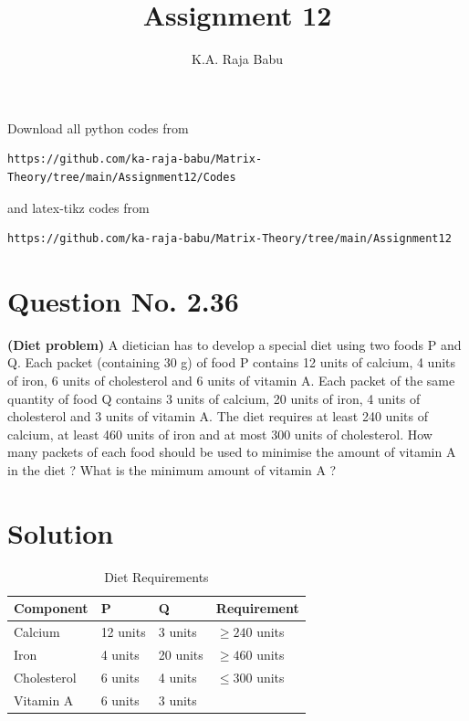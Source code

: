 \documentclass[journal,12pt,twocolumn]{IEEEtran}
\begin{document}
\makeatother
\let\StandardTheFigure\thefigure
\let\vec\mathbf
\renewcommand{\thefigure}{\theproblem}
\def\putbox#1#2#3{\makebox[0in][l]{\makebox[#1][l]{}\raisebox{\baselineskip}[0in][0in]{\raisebox{#2}[0in][0in]{#3}}}}
     \def\rightbox#1{\makebox[0in][r]{#1}}
     \def\centbox#1{\makebox[0in]{#1}}
     \def\topbox#1{\raisebox{-\baselineskip}[0in][0in]{#1}}
     \def\midbox#1{\raisebox{-0.5\baselineskip}[0in][0in]{#1}}
\vspace{3cm}
\title{Assignment 12}
\author{K.A. Raja Babu}
\maketitle
\newpage
\bigskip
\renewcommand{\thefigure}{\theenumi}
\renewcommand{\thetable}{\theenumi}
Download all python codes from 
\begin{lstlisting}
https://github.com/ka-raja-babu/Matrix-Theory/tree/main/Assignment12/Codes
\end{lstlisting}
%
and latex-tikz codes from 
%
\begin{lstlisting}
https://github.com/ka-raja-babu/Matrix-Theory/tree/main/Assignment12
\end{lstlisting}
%
\section{Question No. 2.36}

\textbf{(Diet problem)} A dietician has to develop a special diet using two foods P and Q. Each packet (containing 30 g) of food P contains 12 units of calcium, 4 units of iron, 6 units of cholesterol and 6 units of vitamin A. Each packet of the same quantity of food Q contains 3 units of calcium, 20 units of iron, 4 units of cholesterol and 3 units of vitamin A. The diet requires at least 240 units of calcium, at least 460 units of iron and at most 300 units of cholesterol. How many packets of each food should be used to minimise the amount of vitamin A in the diet ? What is the minimum amount of vitamin A ?

\section{Solution}

\begin{table}[!ht]
\begin{center}
\begin{tabular}{ | m{2.1cm} | m{1.4cm}| m{1.4cm} | m{2.2cm} | } 
\hline
Component & P & Q & Requirement \\
\hline
Calcium & 12 units & 3 units & $\geq 240$ units \\ 
\hline
Iron & 4 units & 20 units & $\geq 460$ units \\ 
\hline
Cholesterol & 6 units & 4 units & $\leq 300$ units\\ 
\hline
Vitamin A & 6 units & 3 units & \\ 
\hline
\end{tabular}
\end{center}
\caption{Diet Requirements}
\label{tab:table1}
\end{table}
\end{document}
